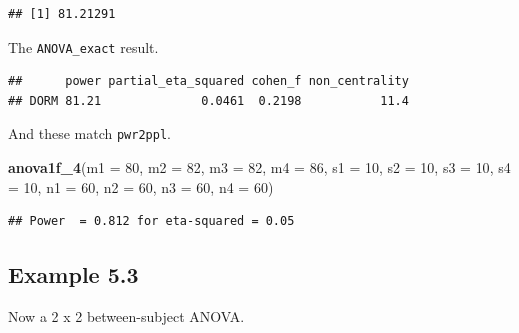 \documentclass[]{book}
\newenvironment{Shaded}{\begin{snugshade}}{\end{snugshade}}
\newcommand{\DataTypeTok}[1]{\textcolor[rgb]{0.13,0.29,0.53}{#1}}
\newcommand{\DecValTok}[1]{\textcolor[rgb]{0.00,0.00,0.81}{#1}}
\newcommand{\KeywordTok}[1]{\textcolor[rgb]{0.13,0.29,0.53}{\textbf{#1}}}
\newcommand{\NormalTok}[1]{#1}
\newcommand{\OperatorTok}[1]{\textcolor[rgb]{0.81,0.36,0.00}{\textbf{#1}}}
\newcommand{\OtherTok}[1]{\textcolor[rgb]{0.56,0.35,0.01}{#1}}
\newcommand{\StringTok}[1]{\textcolor[rgb]{0.31,0.60,0.02}{#1}}
\begin{document}
\begin{verbatim}
## [1] 81.21291
\end{verbatim}

The \texttt{ANOVA\_exact} result.

\begin{Shaded}
\end{Shaded}

\begin{verbatim}
##      power partial_eta_squared cohen_f non_centrality
## DORM 81.21              0.0461  0.2198           11.4
\end{verbatim}

And these match \texttt{pwr2ppl}.

\begin{Shaded}
\begin{Highlighting}[]
\KeywordTok{anova1f_4}\NormalTok{(}\DataTypeTok{m1 =} \DecValTok{80}\NormalTok{, }\DataTypeTok{m2 =} \DecValTok{82}\NormalTok{, }\DataTypeTok{m3 =} \DecValTok{82}\NormalTok{, }\DataTypeTok{m4 =} \DecValTok{86}\NormalTok{,}
          \DataTypeTok{s1 =} \DecValTok{10}\NormalTok{, }\DataTypeTok{s2 =} \DecValTok{10}\NormalTok{, }\DataTypeTok{s3 =} \DecValTok{10}\NormalTok{, }\DataTypeTok{s4 =} \DecValTok{10}\NormalTok{,}
          \DataTypeTok{n1 =} \DecValTok{60}\NormalTok{, }\DataTypeTok{n2 =} \DecValTok{60}\NormalTok{, }\DataTypeTok{n3 =} \DecValTok{60}\NormalTok{, }\DataTypeTok{n4 =} \DecValTok{60}\NormalTok{)}
\end{Highlighting}
\end{Shaded}

\begin{verbatim}
## Power  = 0.812 for eta-squared = 0.05
\end{verbatim}

\hypertarget{example-5.3}{%
\subsection{Example 5.3}\label{example-5.3}}

Now a 2 x 2 between-subject ANOVA.
\end{document}
